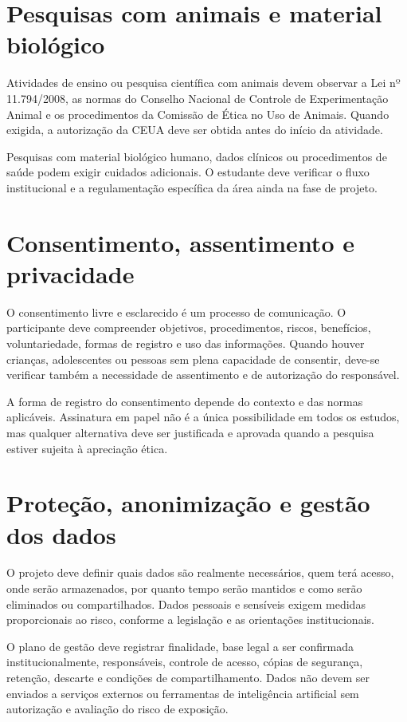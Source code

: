 \section{Pesquisas com animais e material biológico}

Atividades de ensino ou pesquisa científica com animais devem observar a Lei nº 11.794/2008, as normas do Conselho Nacional de Controle de Experimentação Animal e os procedimentos da Comissão de Ética no Uso de Animais. Quando exigida, a autorização da CEUA deve ser obtida antes do início da atividade.

Pesquisas com material biológico humano, dados clínicos ou procedimentos de saúde podem exigir cuidados adicionais. O estudante deve verificar o fluxo institucional e a regulamentação específica da área ainda na fase de projeto.

\section{Consentimento, assentimento e privacidade}

O consentimento livre e esclarecido é um processo de comunicação. O participante deve compreender objetivos, procedimentos, riscos, benefícios, voluntariedade, formas de registro e uso das informações. Quando houver crianças, adolescentes ou pessoas sem plena capacidade de consentir, deve-se verificar também a necessidade de assentimento e de autorização do responsável.

A forma de registro do consentimento depende do contexto e das normas aplicáveis. Assinatura em papel não é a única possibilidade em todos os estudos, mas qualquer alternativa deve ser justificada e aprovada quando a pesquisa estiver sujeita à apreciação ética.

\section{Proteção, anonimização e gestão dos dados}

O projeto deve definir quais dados são realmente necessários, quem terá acesso, onde serão armazenados, por quanto tempo serão mantidos e como serão eliminados ou compartilhados. Dados pessoais e sensíveis exigem medidas proporcionais ao risco, conforme a legislação e as orientações institucionais.

O plano de gestão deve registrar finalidade, base legal a ser confirmada institucionalmente, responsáveis, controle de acesso, cópias de segurança, retenção, descarte e condições de compartilhamento. Dados não devem ser enviados a serviços externos ou ferramentas de inteligência artificial sem autorização e avaliação do risco de exposição.

